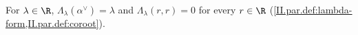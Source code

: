 For $\lambda\in\R$, $\Lambda_\lambda(\alpha^\vee)=\lambda$ and $\Lambda_\lambda(r,r)=0$ for every $r\in\R$
(\cref{II.par.def:lambda-form,II.par.def:coroot}).
